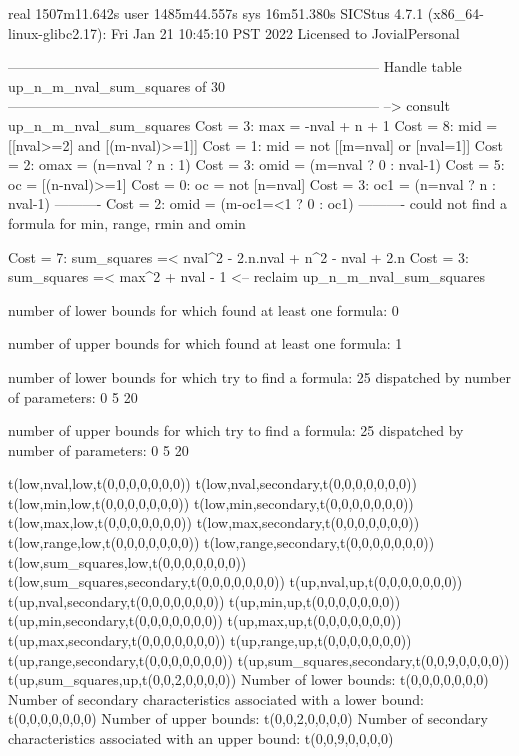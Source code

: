 real	1507m11.642s
user	1485m44.557s
sys	16m51.380s
SICStus 4.7.1 (x86_64-linux-glibc2.17): Fri Jan 21 10:45:10 PST 2022
Licensed to JovialPersonal


--------------------------------------------------------------------------------
Handle table up_n_m_nval_sum_squares of 30
--------------------------------------------------------------------------------
--> consult up_n_m_nval_sum_squares
Cost =  3:  max   = -nval + n + 1
Cost =  8:  mid   = [[nval>=2] and [(m-nval)>=1]]
Cost =  1:  mid   = not [[m=nval] or [nval=1]]
Cost =  2:  omax  = (n=nval ? n : 1)
Cost =  3:  omid  = (m=nval ? 0 : nval-1)
Cost =  5:  oc    = [(n-nval)>=1]
Cost =  0:  oc    = not [n=nval]
Cost =  3:  oc1   = (n=nval ? n : nval-1)
----------
Cost =  2:  omid  = (m-oc1=<1 ? 0 : oc1)
----------
could not find a formula for min, range, rmin and omin

Cost =  7:  sum_squares =< nval^2 - 2.n.nval + n^2 - nval + 2.n
Cost =  3:  sum_squares =< max^2 + nval - 1
<-- reclaim up_n_m_nval_sum_squares

number of lower bounds for which found at least one formula: 0

number of upper bounds for which found at least one formula: 1

number of lower bounds for which try to find a formula: 25
dispatched by number of parameters: 0  5  20

number of upper bounds for which try to find a formula: 25
dispatched by number of parameters: 0  5  20

t(low,nval,low,t(0,0,0,0,0,0,0))
t(low,nval,secondary,t(0,0,0,0,0,0,0))
t(low,min,low,t(0,0,0,0,0,0,0))
t(low,min,secondary,t(0,0,0,0,0,0,0))
t(low,max,low,t(0,0,0,0,0,0,0))
t(low,max,secondary,t(0,0,0,0,0,0,0))
t(low,range,low,t(0,0,0,0,0,0,0))
t(low,range,secondary,t(0,0,0,0,0,0,0))
t(low,sum_squares,low,t(0,0,0,0,0,0,0))
t(low,sum_squares,secondary,t(0,0,0,0,0,0,0))
t(up,nval,up,t(0,0,0,0,0,0,0))
t(up,nval,secondary,t(0,0,0,0,0,0,0))
t(up,min,up,t(0,0,0,0,0,0,0))
t(up,min,secondary,t(0,0,0,0,0,0,0))
t(up,max,up,t(0,0,0,0,0,0,0))
t(up,max,secondary,t(0,0,0,0,0,0,0))
t(up,range,up,t(0,0,0,0,0,0,0))
t(up,range,secondary,t(0,0,0,0,0,0,0))
t(up,sum_squares,secondary,t(0,0,9,0,0,0,0))
t(up,sum_squares,up,t(0,0,2,0,0,0,0))
Number of lower bounds:                                             t(0,0,0,0,0,0,0)
Number of secondary characteristics associated with a lower bound:  t(0,0,0,0,0,0,0)
Number of upper bounds:                                             t(0,0,2,0,0,0,0)
Number of secondary characteristics associated with an upper bound: t(0,0,9,0,0,0,0)

